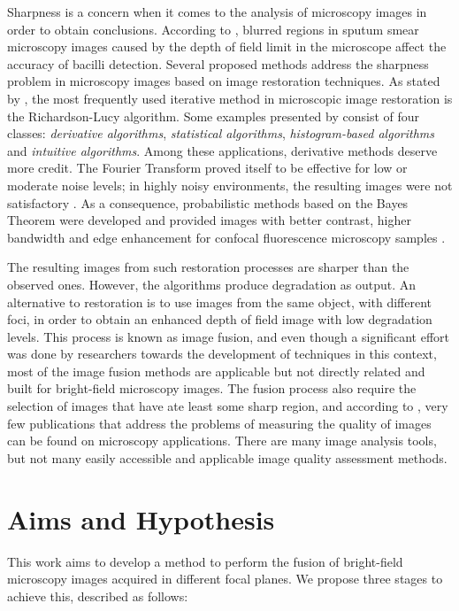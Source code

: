 Sharpness is a concern when it comes to the analysis of microscopy images in order to obtain conclusions. According to , blurred regions in sputum smear microscopy images caused by the depth of field limit in the microscope affect the accuracy of bacilli detection. Several proposed methods address the sharpness problem in microscopy images based on image restoration techniques. As stated by , the most frequently used iterative method in microscopic image restoration is the Richardson-Lucy algorithm. Some examples presented by  consist of four classes: \emph{derivative algorithms}, \emph{statistical algorithms}, \emph{histogram-based algorithms} and \emph{intuitive algorithms}. Among these applications, derivative methods deserve more credit. The Fourier Transform proved itself to be effective for low or moderate noise levels; in highly noisy environments, the resulting images were not satisfactory \cite{richardson1972bayesian}. As a consequence, probabilistic methods based on the Bayes Theorem were developed and provided images with better contrast, higher bandwidth and edge enhancement for confocal fluorescence microscopy samples \cite{ponti2016image}.

The resulting images from such restoration processes are sharper than the observed ones. However, the algorithms produce degradation as output. An alternative to restoration is to use images from the same object, with different foci, in order to obtain an enhanced depth of field image with low degradation levels. This process is known as image fusion, and even though a significant effort was done by researchers towards the development of techniques in this context, most of the image fusion methods are applicable but not directly related and built for bright-field microscopy images. The fusion process also require the selection of images that have ate least some sharp region, and according to , very few publications that address the problems of measuring the quality of images can be found on microscopy applications. There are many image analysis tools, but not many easily accessible and applicable image quality assessment methods.


\section{Aims and Hypothesis}

This work aims to develop a method to perform the fusion of bright-field microscopy images acquired in different focal planes. We propose three stages to achieve this, described as follows:

